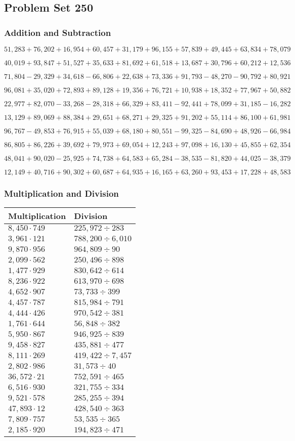 \hypertarget{problem-set-250}{%
\subsection{Problem Set 250}\label{problem-set-250}}

\hypertarget{addition-and-subtraction}{%
\subsubsection{Addition and
Subtraction}\label{addition-and-subtraction}}

\(51,283+76,202+16,954+60,457+31,179+96,155+57,839+49,445+63,834+78,079\)

\(40,019+93,847+51,527+35,633+81,692+61,518+13,687+30,796+60,212+12,536\)

\(71,804-29,329+34,618-66,806+22,638+73,336+91,793-48,270-90,792+80,921\)

\(96,081+35,020+72,893+89,128+19,356+76,721+10,938+18,352+77,967+50,882\)

\(22,977+82,070-33,268-28,318+66,329+83,411-92,441+78,099+31,185-16,282\)

\(13,129+89,069+88,384+29,651+68,271+29,325+91,202+55,114+86,100+61,981\)

\(96,767-49,853+76,915+55,039+68,180+80,551-99,325-84,690+48,926-66,984\)

\(86,805+86,226+39,692+79,973+69,054+12,243+97,098+16,130+45,855+62,354\)

\(48,041+90,020-25,925+74,738+64,583+65,284-38,535-81,820+44,025-38,379\)

\(12,149+40,716+90,302+60,687+64,935+16,165+63,260+93,453+17,228+48,583\)

\hypertarget{multiplication-and-division}{%
\subsubsection{Multiplication and
Division}\label{multiplication-and-division}}

\begin{longtable}[]{@{}ll@{}}
\toprule
Multiplication & Division\tabularnewline
\midrule
\endhead
\(8,450\cdot749\) & \(225,972÷283\)\tabularnewline
\(3,961\cdot121\) & \(788,200÷6,010\)\tabularnewline
\(9,870\cdot956\) & \(964,809÷90\)\tabularnewline
\(2,099\cdot562\) & \(250,496÷898\)\tabularnewline
\(1,477\cdot929\) & \(830,642÷614\)\tabularnewline
\(8,236\cdot922\) & \(613,970÷698\)\tabularnewline
\(4,652\cdot907\) & \(73,733÷399\)\tabularnewline
\(4,457\cdot787\) & \(815,984÷791\)\tabularnewline
\(4,444\cdot426\) & \(970,542÷381\)\tabularnewline
\(1,761\cdot644\) & \(56,848÷382\)\tabularnewline
\(5,950\cdot867\) & \(946,925÷839\)\tabularnewline
\(9,458\cdot827\) & \(435,881÷477\)\tabularnewline
\(8,111\cdot269\) & \(419,422÷7,457\)\tabularnewline
\(2,802\cdot986\) & \(31,573÷40\)\tabularnewline
\(36,572\cdot21\) & \(752,591÷465\)\tabularnewline
\(6,516\cdot930\) & \(321,755÷334\)\tabularnewline
\(9,521\cdot578\) & \(285,255÷394\)\tabularnewline
\(47,893\cdot12\) & \(428,540÷363\)\tabularnewline
\(7,809\cdot757\) & \(53,535÷365\)\tabularnewline
\(2,185\cdot920\) & \(194,823÷471\)\tabularnewline
\bottomrule
\end{longtable}
